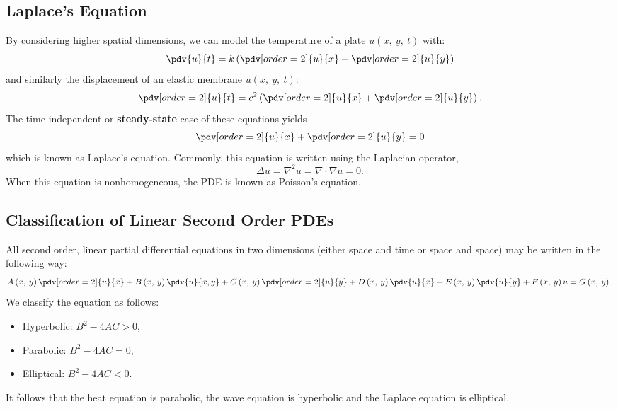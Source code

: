 \documentclass{article}
\begin{document}
\subsection{Laplace's Equation}
By considering higher spatial dimensions, we can model the temperature of a plate \(u\left( x,\: y,\: t \right)\) with:
\begin{equation*}
    \pdv{u}{t} = k \left( \pdv[order=2]{u}{x} + \pdv[order=2]{u}{y} \right)
\end{equation*}
and similarly the displacement of an elastic membrane \(u\left( x,\: y,\: t \right)\):
\begin{equation*}
    \pdv[order=2]{u}{t} = c^2 \left( \pdv[order=2]{u}{x} + \pdv[order=2]{u}{y} \right).
\end{equation*}
The time-independent or \textbf{steady-state} case of these equations yields
\begin{equation*}
    \pdv[order=2]{u}{x} + \pdv[order=2]{u}{y} = 0
\end{equation*}
which is known as Laplace's equation. Commonly, this equation is written using the Laplacian operator,
\begin{equation*}
    \Delta{u} = \nabla^2 u = \nabla \cdot \nabla u = 0.
\end{equation*}
When this equation is nonhomogeneous, the PDE is known as Poisson's equation.
\subsection{Classification of Linear Second Order PDEs}
All second order, linear partial differential equations in two dimensions (either space and time or space and space) may be written in the following way:
\begin{equation*}
    A\left( x,\: y \right) \pdv[order=2]{u}{x} + B\left( x,\: y \right) \pdv{u}{x,y} + C\left( x,\: y \right) \pdv[order=2]{u}{y} + D\left( x,\: y \right) \pdv{u}{x} + E\left( x,\: y \right) \pdv{u}{y} + F\left( x,\: y \right) u = G\left( x,\: y \right).
\end{equation*}
We classify the equation as follows:
\begin{itemize}
    \item Hyperbolic: \(B^2 - 4A C > 0\),
    \item Parabolic: \(B^2 - 4A C = 0\),
    \item Elliptical: \(B^2 - 4A C < 0\).
\end{itemize}
It follows that the heat equation is parabolic, the wave equation is hyperbolic and the Laplace equation is elliptical.
\end{document}
